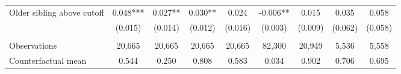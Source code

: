 {{\begin{tabular}{lcccccccc}
Older sibling above cutoff&       0.048***&       0.027** &       0.030** &       0.024   &      -0.006** &       0.015   &       0.035   &       0.058   \\
                    &     (0.015)   &     (0.014)   &     (0.012)   &     (0.016)   &     (0.003)   &     (0.009)   &     (0.062)   &     (0.058)   \\
                    &               &               &               &               &               &               &               &               \\
Observations        &      20,665   &      20,665   &      20,665   &      20,665   &      82,300   &      20,949   &       5,536   &       5,558   \\
Counterfactual mean &       0.544   &       0.250   &       0.808   &       0.583   &       0.034   &       0.902   &       0.706   &       0.695   \\
 

\bottomrule
\end{tabular}
}
}
